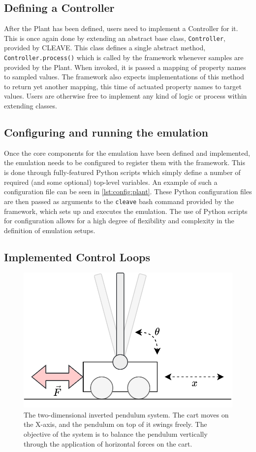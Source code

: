 \subsection{Defining a Controller}

After the Plant has been defined, users need to implement a Controller for it.
This is once again done by extending an abstract base class, \texttt{Controller}, provided by CLEAVE.\@
This class defines a single abstract method, \texttt{Controller.process()} which is called by the framework whenever samples are provided by the Plant.
When invoked, it is passed a mapping of property names to sampled values.
The framework also expects implementations of this method to return yet another mapping, this time of actuated property names to target values.
Users are otherwise free to implement any kind of logic or process within extending classes.

\subsection{Configuring and running the emulation}

Once the core components for the emulation have been defined and implemented, the emulation needs to be configured to register them with the framework.
This is done through fully-featured Python scripts which simply define a number of required (and some optional) top-level variables.
An example of such a configuration file can be seen in \cref{lst:config:plant}.
These Python configuration files are then passed as arguments to the \texttt{cleave} bash command provided by the framework, which sets up and executes the emulation.
The use of Python scripts for configuration allows for a high degree of flexibility and complexity in the definition of emulation setups.

\subsection{Implemented Control Loops}

\begin{figure}
    \centering
    \includegraphics[width=.7\columnwidth]{images/inverted_pendulum.png}
    \caption{
        The two-dimensional inverted pendulum system.
        The cart moves on the X-axis, and the pendulum on top of it swings freely.
        The objective of the system is to balance the pendulum vertically through the application of horizontal forces on the cart.
    }\label{fig:invpend}
\end{figure}

